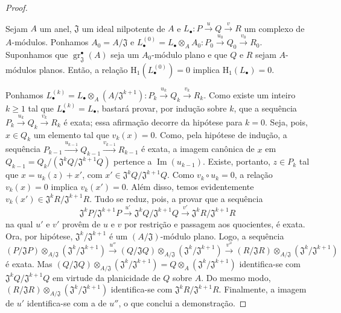 \begin{proof}
\begin{lemma}[12.3.3.5]
\label{IV.12.3.3.5}
Sejam $A$ um anel, $\mathfrak{J}$ um ideal nilpotente de
$A$ e $L_\bullet:P\xrightarrow{u}Q\xrightarrow{v}R$
um complexo de $A$-módulos.
Ponhamos $A_0=A/\mathfrak{J}$ e
$L_\bullet^{(0)}=L_\bullet\otimes_A A_0:P_0\xrightarrow{u_0}Q_0\xrightarrow{v_0}R_0$.
Suponhamos que $\operatorname{gr}_{\mathfrak{J}}^{\bullet}(A)$
seja um $A_0$-módulo plano e que $Q$ e $R$ sejam
$A$-módulos planos.
Então, a relação $\mathrm{H}_1(L_\bullet^{(0)})=0$
implica $\mathrm{H}_1(L_\bullet)=0$.
\end{lemma}

Ponhamos
$L_\bullet^{(k)}=L_\bullet\otimes_A(A/\mathfrak{J}^{k+1}):P_k\xrightarrow{u_k}Q_k\xrightarrow{v_k}R_k$.
Como existe um inteiro $k\geqslant1$ tal que
$L_\bullet^{(k)}=L_\bullet$, bastará provar, por
indução sobre $k$, que a sequência
$P_k\xrightarrow{u_k}Q_k\xrightarrow{v_k}R_k$
é exata; essa afirmação decorre da hipótese para $k=0$.
Seja, pois, $x\in Q_k$ um elemento tal que $v_k(x)=0$.
Como, pela hipótese de indução, a sequência
$P_{k-1}\xrightarrow{u_{k-1}}Q_{k-1}\xrightarrow{v_{k-1}}R_{k-1}$
é exata, a imagem canônica de $x$ em
$Q_{k-1}=Q_k/(\mathfrak{J}^kQ/\mathfrak{J}^{k+1}Q)$
pertence a $\operatorname{Im}(u_{k-1})$.
Existe, portanto, $z\in P_k$ tal que $x=u_k(z)+x'$,
com $x'\in\mathfrak{J}^kQ/\mathfrak{J}^{k+1}Q$.
Como $v_k\circ u_k=0$, a relação $v_k(x)=0$
implica $v_k(x')=0$.
Além disso, temos evidentemente
$v_k(x')\in\mathfrak{J}^kR/\mathfrak{J}^{k+1}R$.
Tudo se reduz, pois, a provar que a sequência
\[
\mathfrak{J}^kP/\mathfrak{J}^{k+1}P
\xrightarrow{u'}
\mathfrak{J}^kQ/\mathfrak{J}^{k+1}Q
\xrightarrow{v'}
\mathfrak{J}^kR/\mathfrak{J}^{k+1}R
\]
na qual $u'$ e $v'$ provêm de $u$ e $v$ por restrição
e passagem aos quocientes, é exata.
Ora, por hipótese, $\mathfrak{J}^k/\mathfrak{J}^{k+1}$
é um $(A/\mathfrak{J})$-módulo plano.
Logo, a sequência
\[
(P/\mathfrak{J}P)\otimes_{A/\mathfrak{J}}(\mathfrak{J}^k/\mathfrak{J}^{k+1})
\xrightarrow{u''}
(Q/\mathfrak{J}Q)\otimes_{A/\mathfrak{J}}(\mathfrak{J}^k/\mathfrak{J}^{k+1})
\xrightarrow{v''}
(R/\mathfrak{J}R)\otimes_{A/\mathfrak{J}}(\mathfrak{J}^k/\mathfrak{J}^{k+1})
\]
é exata.
Mas
$(Q/\mathfrak{J}Q)\otimes_{A/\mathfrak{J}}(\mathfrak{J}^k/\mathfrak{J}^{k+1})=Q\otimes_A(\mathfrak{J}^k/\mathfrak{J}^{k+1})$
identifica-se com $\mathfrak{J}^kQ/\mathfrak{J}^{k+1}Q$
em virtude da planicidade de $Q$ sobre $A$.
Do mesmo modo,
$(R/\mathfrak{J}R)\otimes_{A/\mathfrak{J}}(\mathfrak{J}^k/\mathfrak{J}^{k+1})$
identifica-se com $\mathfrak{J}^kR/\mathfrak{J}^{k+1}R$.
Finalmente, a imagem de $u'$ identifica-se com a
de $u''$, o que conclui a demonstração.
\end{proof}

